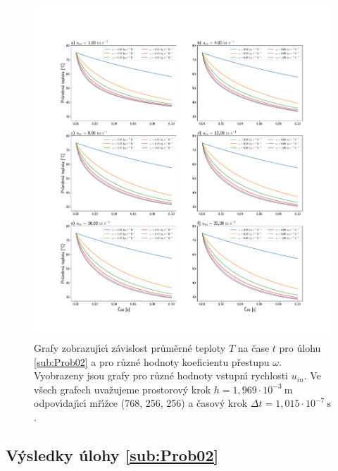         \begin{figure}[H]
            \centering
            \includegraphics[width=\linewidth, trim=4cm 4cm 4cm 8cm]{Img/Kapitola 3/Probl10_b.pdf}
            \caption{Grafy zobrazuj\'{\i}c\'{\i} z\'{a}vislost pr\r{u}m\v{e}rn\'{e} teploty $T$ na \v{c}ase $t$ pro \'{u}lohu \ref{sub:Prob02} a pro r\r{u}zn\'{e} hodnoty koeficientu p\v{r}estupu $\omega$. Vyobrazeny jsou grafy pro r\r{u}zn\'{e} hodnoty vstupn\'{\i} rychlosti $u_{in}$. Ve v\v{s}ech grafech uva\v{z}ujeme prostorov\'{y} krok $h = 1{,}969 \cdot 10^{-3} \ \mathrm{m}$ odpov\'{\i}daj\'{\i}c\'{\i} m\v{r}\'{\i}\v{z}ce (768, 256, 256) a \v{c}asov\'{y} krok $\Delta t = 1{,}015 \cdot 10^{-7} \ \mathrm{s}$.}
            \label{fig:Probl10_b}
        \end{figure}





        \subsection{V\'{y}sledky \'{u}lohy \ref{sub:Prob02}}

